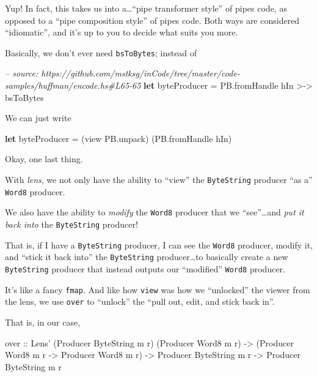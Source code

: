 \documentclass[]{article}
\newenvironment{Shaded}{\begin{snugshade}}{\end{snugshade}}
\newcommand{\CommentTok}[1]{\textcolor[rgb]{0.56,0.35,0.01}{\textit{#1}}}
\newcommand{\DataTypeTok}[1]{\textcolor[rgb]{0.13,0.29,0.53}{#1}}
\newcommand{\FunctionTok}[1]{\textcolor[rgb]{0.00,0.00,0.00}{#1}}
\newcommand{\KeywordTok}[1]{\textcolor[rgb]{0.13,0.29,0.53}{\textbf{#1}}}
\newcommand{\NormalTok}[1]{#1}
\newcommand{\OtherTok}[1]{\textcolor[rgb]{0.56,0.35,0.01}{#1}}
\begin{document}
Yup! In fact, this takes us into a\ldots{}``pipe transformer style'' of pipes
code, as opposed to a ``pipe composition style'' of pipes code. Both ways are
considered ``idiomatic'', and it's up to you to decide what suits you more.

Basically, we don't ever need \texttt{bsToBytes}; instead of

\begin{Shaded}
\begin{Highlighting}[]
\CommentTok{-- source: https://github.com/mstksg/inCode/tree/master/code-samples/huffman/encode.hs#L65-65}
    \KeywordTok{let}\NormalTok{ byteProducer }\FunctionTok{=}\NormalTok{ PB.fromHandle hIn }\FunctionTok{>->}\NormalTok{ bsToBytes}
\end{Highlighting}
\end{Shaded}

We can just write

\begin{Shaded}
\begin{Highlighting}[]
\KeywordTok{let}\NormalTok{ byteProducer }\FunctionTok{=}\NormalTok{ (view PB.unpack) (PB.fromHandle hIn)}
\end{Highlighting}
\end{Shaded}

Okay, one last thing.

With \emph{lens}, we not only have the ability to ``view'' the
\texttt{ByteString} producer ``as a'' \texttt{Word8} producer.

We also have the ability to \emph{modify} the \texttt{Word8} producer that we
``see''\ldots{}and \emph{put it back into} the \texttt{ByteString} producer!

That is, if I have a \texttt{ByteString} producer, I can see the \texttt{Word8}
producer, modify it, and ``stick it back into'' the \texttt{ByteString}
producer\ldots{}to basically create a new \texttt{ByteString} producer that
instead outputs our ``modified'' \texttt{Word8} producer.

It's like a fancy \texttt{fmap}. And like how \texttt{view} was how we
``unlocked'' the viewer from the lens, we use \texttt{over} to ``unlock'' the
``pull out, edit, and stick back in''.

That is, in our case,

\begin{Shaded}
\begin{Highlighting}[]
\OtherTok{over ::} \DataTypeTok{Lens'}\NormalTok{ (}\DataTypeTok{Producer} \DataTypeTok{ByteString}\NormalTok{ m r) (}\DataTypeTok{Producer} \DataTypeTok{Word8}\NormalTok{ m r)}
     \OtherTok{->}\NormalTok{ (}\DataTypeTok{Producer} \DataTypeTok{Word8}\NormalTok{ m r }\OtherTok{->} \DataTypeTok{Producer} \DataTypeTok{Word8}\NormalTok{ m r)}
     \OtherTok{->} \DataTypeTok{Producer} \DataTypeTok{ByteString}\NormalTok{ m r}
     \OtherTok{->} \DataTypeTok{Producer} \DataTypeTok{ByteString}\NormalTok{ m r}
\end{Highlighting}
\end{Shaded}
\end{document}
